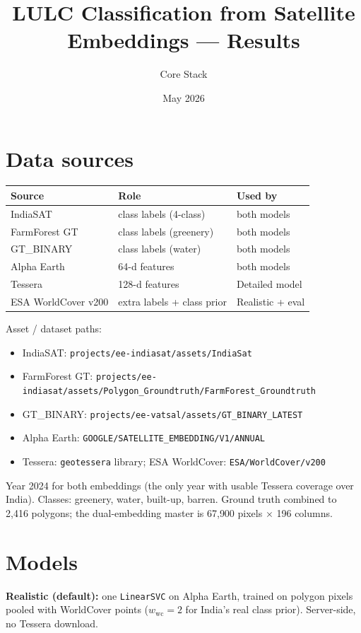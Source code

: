 \documentclass[11pt]{article}
\title{\textbf{LULC Classification from Satellite Embeddings} --- Results}
\author{Core Stack}
\date{May 2026}
\begin{document}
\maketitle

\section{Data sources}
\begin{table}[h]
\centering
\begin{tabular}{l l l}
\toprule
\textbf{Source} & \textbf{Role} & \textbf{Used by} \\
\midrule
IndiaSAT          & class labels (4-class)     & both models \\
FarmForest GT     & class labels (greenery)    & both models \\
GT\_BINARY        & class labels (water)       & both models \\
Alpha Earth       & 64-d features              & both models \\
Tessera           & 128-d features             & Detailed model \\
ESA WorldCover v200 & extra labels + class prior & Realistic + eval \\
\bottomrule
\end{tabular}
\end{table}

\noindent Asset / dataset paths:
{\small
\begin{itemize}\setlength\itemsep{0pt}
  \item IndiaSAT: \texttt{projects/ee-indiasat/assets/IndiaSat}
  \item FarmForest GT: \texttt{projects/ee-indiasat/assets/}\allowbreak\texttt{Polygon\_Groundtruth/FarmForest\_Groundtruth}
  \item GT\_BINARY: \texttt{projects/ee-vatsal/assets/GT\_BINARY\_LATEST}
  \item Alpha Earth: \texttt{GOOGLE/SATELLITE\_EMBEDDING/V1/ANNUAL}
  \item Tessera: \texttt{geotessera} library; ESA WorldCover: \texttt{ESA/WorldCover/v200}
\end{itemize}}

\noindent Year 2024 for both embeddings (the only year with usable Tessera coverage
over India). Classes: greenery, water, built-up, barren. Ground truth combined to
2{,}416 polygons; the dual-embedding master is 67{,}900 pixels $\times$ 196 columns.

\section{Models}
\textbf{Realistic (default):} one \texttt{LinearSVC} on Alpha Earth, trained on
polygon pixels pooled with WorldCover points ($w_{\text{wc}}{=}2$ for India's real
class prior). Server-side, no Tessera download.
\end{document}
